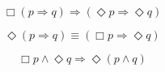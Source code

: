 \documentclass[fleqn, leqno]{article}
\newcommand{\event}{\Diamond}
\newcommand{\always}{\Box}
\newcommand{\spacer}{\vspace{-30pt}}
\begin{document}
\spacer

\begin{equation}\label{E:alwaysImpEvents}
\always (p \Rightarrow q) \Rightarrow (\event p \Rightarrow \event q)
\end{equation}

\spacer

\begin{equation}\label{E:eventImpAlways}
\event (p \Rightarrow q) \equiv (\always p \Rightarrow \event q)
\end{equation}

\spacer

\begin{equation}\label{E:alwaysAndEvent}
\always p \land \event q \Rightarrow \event (p \land q)
\end{equation}
\end{document}
